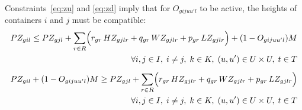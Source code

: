 Constraints~\eqref{eq:zu} and \eqref{eq:zd} imply that for \(O_{gijuu'l}\) to be active, the heights of containers \(i\) and \(j\) must be compatible:
\begin{gather}
  \begin{split}
    PZ_{gil} \leq PZ_{gjl}+\sum_{r \in R}\Bigl(r_{gr}\, HZ_{gjlr}+ q_{gr}\, WZ_{gjlr}+ p_{gr}\, LZ_{gjlr}\Bigr) + (1-O_{gijuu'l})M\\
    \forall i,j\in I,\; i\neq j,\; k\in K,\; (u,u')\in U\times U,\; t \in T \label{eq:zu}
  \end{split}\\[0.5em]
  \begin{split}
    PZ_{gil}+(1-O_{gijuu'l})M \geq PZ_{gjl}+\sum_{r \in R}\Bigl(r_{gr}\, HZ_{gjlr}+ q_{gr}\, WZ_{gjlr}+ p_{gr}\, LZ_{gjlr}\Bigr)\\
    \forall i,j\in I,\; i\neq j,\; k\in K,\; (u,u')\in U\times U,\; t \in T \label{eq:zd}
  \end{split}
\end{gather}

